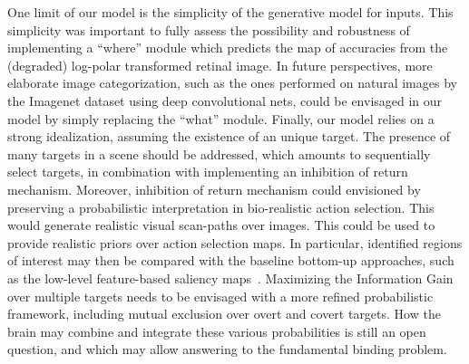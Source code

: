 


One limit of our model is the simplicity of the generative model for inputs. This simplicity was important to fully assess the possibility and robustness of implementing a ``where'' module which predicts the map of accuracies from the (degraded) log-polar transformed retinal image.
In future perspectives, more elaborate image categorization, such as the ones performed on natural images by the Imagenet dataset using deep convolutional nets, could be envisaged in our model by simply replacing the ``what'' module. 
Finally, our model relies on a strong idealization, assuming the existence of an unique target. The presence of many targets in a scene should be addressed, which amounts to sequentially select targets, in combination with implementing an inhibition of return mechanism. Moreover, inhibition of return mechanism could envisioned by preserving a probabilistic interpretation in bio-realistic action selection. This would generate realistic visual scan-paths over images. This could be used to provide realistic priors over action selection maps.  In particular, identified regions of interest may then be compared with the baseline bottom-up approaches, such as the low-level feature-based saliency maps~\citep{Itti01}. Maximizing the Information Gain over multiple targets needs to be envisaged with a more refined probabilistic framework, including mutual exclusion over overt and covert targets. How the brain may combine and integrate these various probabilities is still an open question, and which may allow answering to the fundamental binding problem. %
